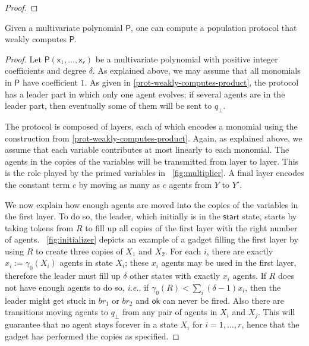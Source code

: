 \documentclass[10pt,a4paper]{article}
\newcommand{\config}{\gamma}
\newcommand*{\apoly}{\mathsf{P}}
\newcommand{\varx}{\mathsf{x}}
\newcommand*{\startstate}{\mathsf{start}}
\newcommand*{\statex}[1]{X_{#1}}
\newcommand*{\okaction}{\mathsf{ok}}
\newcommand{\maxexp}{\delta}
\newcommand{\reservoirstate}{R}
\newcommand{\cheatstate}{q_\bot}
\begin{document}
\begin{toappendix}
\begin{proof}
	\end{proof}

	\begin{lemma}
		\label{prot-weakly-computes-poly}
		Given a multivariate polynomial \(\apoly\), one can compute a population protocol that weakly computes \(\apoly\).
	\end{lemma}
	\begin{proof}
		Let \(\apoly(\varx_1, \dots, \varx_r)\) be a multivariate polynomial with positive integer coefficients and degree \(\maxexp\).
		As explained above, we may assume that all monomials in \(\apoly\) have coefficient \(1\).
		As given in \cref{prot-weakly-computes-product}, the protocol has a leader part in which only one agent evolves; if several agents are in the leader part, then eventually some of them will be sent to \(\cheatstate\).

		The protocol is composed of layers, each of which encodes a monomial using the construction from \cref{prot-weakly-computes-product}.
		Again, as explained above, we assume that each variable contributes at most linearly to each monomial.
		The agents in the copies of the variables will be transmitted from layer to layer.
		This is the role played by the primed variables in \figurename~\ref{fig:multiplier}.
		A final layer encodes the constant term \(c\) by moving as many as \(c\) agents from \(Y\) to \(Y'\).

		We now explain how enough agents are moved into the copies of the variables in the first layer.
		To do so, the leader, which initially is in the \(\startstate\) state, starts by taking tokens from \(\reservoirstate\) to fill up all copies of the first layer with the right number of agents.
		\figurename~\ref{fig:initializer} depicts an example of a gadget filling the first layer by using \(\reservoirstate\) to create three copies of \(X_1\) and \(X_2\).
		For each \(i\), there are exactly \(x_i := \config_0(\statex{i})\) agents in state \(\statex{i}\); these \(x_i\) agents may be used in the first layer, therefore the leader must fill up \(\maxexp\) other states with exactly \(x_i\) agents.
		If \(\reservoirstate\) does not have enough agents to do so, \emph{i.e.}, if \(\config_0(\reservoirstate) < \sum_i (\maxexp-1) x_i\), then the leader might get stuck in \(br_1\) or \(br_2\) and \(\okaction\) can never be fired.
		Also there are transitions moving agents to \(q_\bot\) from any pair of agents in \(X_i\) and \(X_j\).
		This will guarantee that no agent stays forever in a state \(X_i\) for \(i=1,\ldots,r\), hence that the gadget has performed the copies as specified.


\end{proof}
\end{toappendix}
\end{document}
